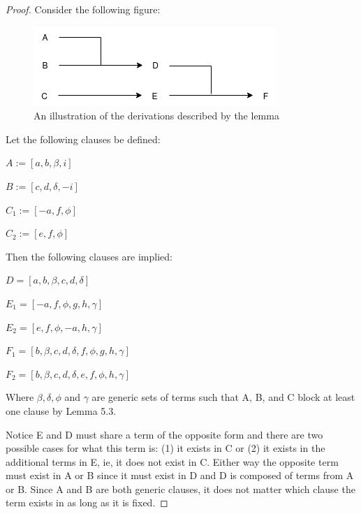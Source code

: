 \documentclass[manuscript]{acmart}
\begin{document}
    \begin{proof}
        Consider the following figure:

        \begin{figure}[h]
            \includegraphics[scale=0.8]{518a}
            \caption{An illustration of the derivations described by the lemma}
        \end{figure}

        Let the following clauses be defined:

        $A := [a, b, \beta, i]$

        $B := [c, d, \delta, -i]$

        $C_1 := [-a, f, \phi]$
        
        $C_2 := [e, f, \phi]$
        
        Then the following clauses are implied:
        
        $D = [a, b, \beta, c, d, \delta]$
        
        $E_1 = [-a, f, \phi, g, h, \gamma]$
        
        $E_2 = [e, f, \phi, -a, h, \gamma]$
        
        $F_1 = [b, \beta, c, d, \delta, f, \phi, g, h, \gamma]$
        
        $F_2 = [b, \beta, c, d, \delta, e, f, \phi, h, \gamma]$
        
        Where $\beta, \delta, \phi$ and $\gamma$ are generic sets of terms
        such that A, B, and C block at least one clause by Lemma 5.3.
        
        Notice E and D must share a term of the opposite form and there
        are two possible cases for what this term is: (1) it exists in
        C or (2) it exists in the additional terms in E, ie, it does not
        exist in C. Either way the opposite term must exist in A or B
        since it must exist in D and D is composed of terms from A or B.
        Since A and B are both generic clauses, it does not matter which
        clause the term exists in as long as it is fixed.


\end{proof}
\end{document}

